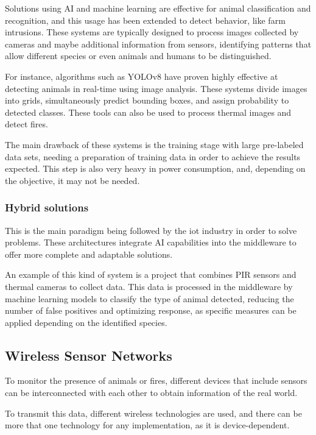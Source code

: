 Solutions using AI and machine learning are effective for animal classification and recognition, and this usage has been extended to detect 
behavior, like farm intrusions\cite{PDFWildAnimals}. These systems are typically designed to process images collected by cameras and maybe 
additional information from sensors, identifying patterns that allow different species or even animals and humans to be distinguished.

For instance, algorithms such as YOLOv8 have proven highly effective at detecting animals in real-time using image 
analysis\cite{WildAnimalDetection}. These systems divide images into grids, simultaneously predict bounding boxes, and assign probability to detected 
classes. These tools can also be used to process thermal images and detect fires. 

The main drawback of these systems is the training stage with large pre-labeled data sets, needing a preparation of training data 
in order to achieve the results expected. This step is also very heavy in power consumption, and, depending on the objective, it may not be needed.

\subsubsection*{Hybrid solutions}

This is the main paradigm being followed by the \acrshort{iot} industry in order to solve problems. These architectures 
integrate AI capabilities into the middleware to offer more complete and adaptable solutions.

An example of this kind of system is a project that combines PIR sensors and thermal cameras to collect data. This data is processed 
in the middleware by machine learning models to classify the type of animal detected, reducing the number of false positives and optimizing 
response, as specific measures can be applied depending on the identified species\cite{StudyMethodsAnimal}.

\subsection{Wireless Sensor Networks}

To monitor the presence of animals or fires, different devices that include sensors can be interconnected with each other to obtain 
information of the real world.

To transmit this data, different wireless technologies are used, and there can be more that one technology for any 
implementation, as it is device-dependent. 


